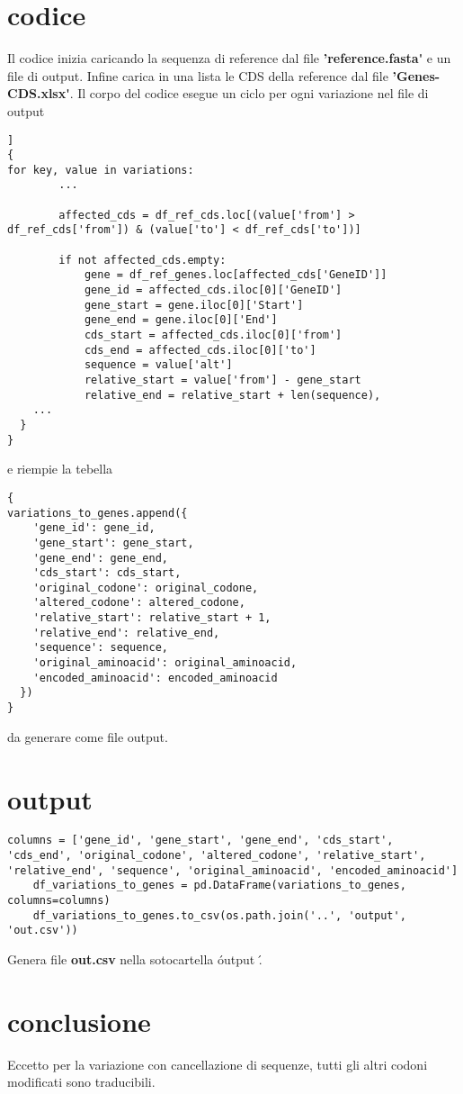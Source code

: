\documentclass[11pt,italian]{article}
\begin{document}
\section{codice}
	Il codice inizia caricando la sequenza di reference dal file \textbf{'reference.fasta\'} e un file di output.\newline %
	Infine carica in una lista le CDS della reference dal file \textbf{'Genes-CDS.xlsx\'}. \newline
	Il  corpo del codice esegue un ciclo per ogni variazione nel file di output 
	\begin{lstlisting}[basicstyle=\small\ttfamily,caption=Porzione di ciclo,label=code:variations_to_genes = []]
{
for key, value in variations:
        ...
        
        affected_cds = df_ref_cds.loc[(value['from'] > df_ref_cds['from']) & (value['to'] < df_ref_cds['to'])]

        if not affected_cds.empty:
            gene = df_ref_genes.loc[affected_cds['GeneID']]
            gene_id = affected_cds.iloc[0]['GeneID']
            gene_start = gene.iloc[0]['Start']
            gene_end = gene.iloc[0]['End']
            cds_start = affected_cds.iloc[0]['from']
            cds_end = affected_cds.iloc[0]['to']
            sequence = value['alt']
            relative_start = value['from'] - gene_start
            relative_end = relative_start + len(sequence),
    ...
  }
}
\end{lstlisting}
	e riempie la tebella
\begin{lstlisting}[basicstyle=\small\ttfamily,caption=Appending nel file di output,label=code:variations_to_genes]
{
variations_to_genes.append({
	'gene_id': gene_id,
	'gene_start': gene_start,
	'gene_end': gene_end,
	'cds_start': cds_start,
	'original_codone': original_codone,
	'altered_codone': altered_codone,
	'relative_start': relative_start + 1,
	'relative_end': relative_end,
	'sequence': sequence,
	'original_aminoacid': original_aminoacid,
	'encoded_aminoacid': encoded_aminoacid
  })
}
\end{lstlisting}	
	da generare come file output.
	
\section{output}
\begin{lstlisting}[basicstyle=\small\ttfamily,caption=Generazione di output,label=code:output]
	columns = ['gene_id', 'gene_start', 'gene_end', 'cds_start', 'cds_end', 'original_codone', 'altered_codone', 'relative_start', 'relative_end', 'sequence', 'original_aminoacid', 'encoded_aminoacid']
	df_variations_to_genes = pd.DataFrame(variations_to_genes, columns=columns)
	df_variations_to_genes.to_csv(os.path.join('..', 'output', 'out.csv'))
\end{lstlisting}	
Genera file \textbf{out.csv} nella sotocartella \' output \' .

\section{conclusione}
Eccetto per la variazione con cancellazione di sequenze, tutti gli altri codoni modificati sono traducibili.
\end{document}
